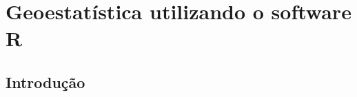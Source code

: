 




\newcommand{\estiloR}{
	\lstset{ %
		language=R,                     %
		basicstyle=\footnotesize,       %
		numbers=left,                   %
		numberstyle=\tiny\color{gray},  %
		stepnumber=1,                   %
		numbersep=5pt,                  %
		backgroundcolor=\color{white},  %
		showspaces=false,               %
		showstringspaces=false,         %
		showtabs=false,                 %
		frame=single,                   %
		rulecolor=\color{black},        %
		tabsize=2,                      %
		captionpos=b,                   %
		breaklines=true,                %
		breakatwhitespace=false,        %
		title=\lstname,                 %
		keywordstyle=\color{blue},      %
		commentstyle=\color{darkgreen},   %
		stringstyle=\color{red},      %
		escapeinside={\%*}{*)},         %
		morekeywords={*,...}          %
}}





\chapter{Geoestatística utilizando o software R}


\section{Introdução}

